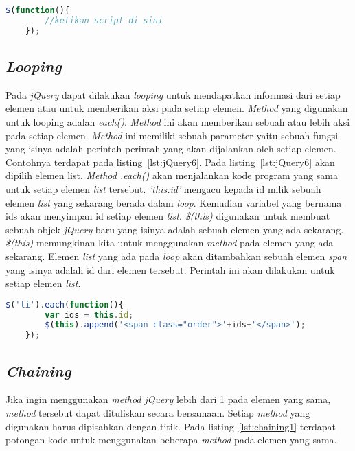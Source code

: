 \begin{lstlisting}[language=Javascript, caption=Pintasan dari method \$(document).ready() , label={lst:jQuery5}]
	$(function(){
		//ketikan script di sini
	});
\end{lstlisting}

\subsection{\textit{Looping}}
Pada \textit{jQuery} dapat dilakukan \textit{looping} untuk mendapatkan informasi dari setiap elemen atau untuk memberikan aksi pada setiap elemen. \textit{Method} yang digunakan untuk looping adalah \textit{each()}. \textit{Method} ini akan memberikan sebuah atau lebih aksi pada setiap elemen. \textit{Method} ini memiliki sebuah parameter yaitu sebuah fungsi yang isinya adalah perintah-perintah yang akan dijalankan oleh setiap elemen. Contohnya terdapat pada listing~\ref{lst:jQuery6}. Pada listing~\ref{lst:jQuery6} akan dipilih elemen list. \textit{Method .each()} akan menjalankan kode program yang sama untuk setiap elemen \textit{list} tersebut. \textit{'this.id'} mengacu kepada id milik sebuah elemen \textit{list} yang sekarang berada dalam \textit{loop}. Kemudian variabel yang bernama ids akan menyimpan id setiap elemen \textit{list}. \textit{\$(this)} digunakan untuk membuat sebuah objek \textit{jQuery} baru yang isinya adalah sebuah elemen yang ada sekarang. \textit{\$(this)} memungkinan kita untuk menggunakan \textit{method} pada elemen yang ada sekarang. Elemen \textit{list} yang ada pada \textit{loop} akan ditambahkan sebuah elemen \textit{span} yang isinya adalah id dari elemen tersebut. Perintah ini akan dilakukan untuk setiap elemen \textit{list}.

\begin{lstlisting}[language=Javascript, caption=Menambah setiap elemen \textit{list} dengan id \textit{list} masing-masing , label={lst:jQuery6}]
	$('li').each(function(){
		var ids = this.id;
		$(this).append('<span class="order">'+ids+'</span>');
	});
\end{lstlisting}

\subsection{\textit{Chaining}}
Jika ingin menggunakan \textit{method jQuery} lebih dari 1 pada elemen yang sama, \textit{method} tersebut dapat dituliskan secara bersamaan. Setiap \textit{method} yang digunakan harus dipisahkan dengan titik. Pada listing~\ref{lst:chaining1} terdapat potongan kode untuk menggunakan beberapa \textit{method} pada elemen yang sama. 

